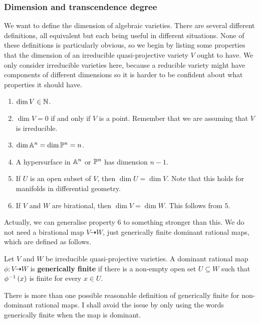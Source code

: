 \subsubsection{Dimension and transcendence degree}


We want to define the dimension of algebraic varieties. There are several different definitions, all equivalent but each being useful in different situations. None of these definitions is particularly obvious, so we begin by listing some properties that the dimension of an irreducible quasi-projective variety $ V $ ought to have. We only consider irreducible varieties here, because a reducible variety might have components of different dimensions so it is harder to be confident about what properties it should have.
\begin{enumerate}
\item $ \dim V \in \NN $.
\item $ \dim V = 0 $ if and only if $ V $ is a point. Remember that we are assuming that $ V $ is irreducible.
\item $ \dim \AA^n = \dim \PP^n = n $.
\item A hypersurface in $ \AA^n $ or $ \PP^n $ has dimension $ n - 1 $.
\item If $ U $ is an open subset of $ V $, then $ \dim U = \dim V $. Note that this holds for manifolds in differential geometry.
\item If $ V $ and $ W $ are birational, then $ \dim V = \dim W $. This follows from $ 5 $.
\end{enumerate}
Actually, we can generalise property $ 6 $ to something stronger than this. We do not need a birational map $ V \dashrightarrow W $, just generically finite dominant rational maps, which are defined as follows.

\begin{definition*}
Let $ V $ and $ W $ be irreducible quasi-projective varieties. A dominant rational map $ \phi : V \dashrightarrow W $ is \textbf{generically finite} if there is a non-empty open set $ U \subseteq W $ such that $ \phi^{-1}\br{x} $ is finite for every $ x \in U $.
\end{definition*}

\begin{note*}
There is more than one possible reasonable definition of generically finite for non-dominant rational maps. I shall avoid the issue by only using the words generically finite when the map is dominant.
\end{note*}

